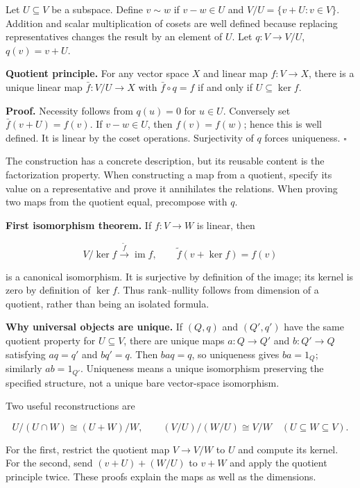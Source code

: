 \documentclass[
  11pt,
]{article}
\begin{document}
Let \(U\subseteq V\) be a subspace. Define \(v\sim w\) if \(v-w\in U\)
and \(V/U=\{v+U:v\in V\}\). Addition and scalar multiplication of cosets
are well defined because replacing representatives changes the result by
an element of \(U\). Let \(q:V\to V/U\), \(q(v)=v+U\).

\textbf{Quotient principle.} For any vector space \(X\) and linear map
\(f:V\to X\), there is a unique linear map \(\bar f:V/U\to X\) with
\(\bar f\circ q=f\) if and only if \(U\subseteq\ker f\).

\textbf{Proof.} Necessity follows from \(q(u)=0\) for \(u\in U\).
Conversely set \(\bar f(v+U)=f(v)\). If \(v-w\in U\), then
\(f(v)=f(w)\); hence this is well defined. It is linear by the coset
operations. Surjectivity of \(q\) forces uniqueness. \(\square\)

The construction has a concrete description, but its reusable content is
the factorization property. When constructing a map from a quotient,
specify its value on a representative and prove it annihilates the
relations. When proving two maps from the quotient equal, precompose
with \(q\).

\textbf{First isomorphism theorem.} If \(f:V\to W\) is linear, then

\[V/\ker f\xrightarrow{\ \widetilde f\ }\operatorname{im}f,
\qquad \widetilde f(v+\ker f)=f(v)
\]

is a canonical isomorphism. It is surjective by definition of the image;
its kernel is zero by definition of \(\ker f\). Thus rank--nullity
follows from dimension of a quotient, rather than being an isolated
formula.

\textbf{Why universal objects are unique.} If \((Q,q)\) and \((Q',q')\)
have the same quotient property for \(U\subseteq V\), there are unique
maps \(a:Q\to Q'\) and \(b:Q'\to Q\) satisfying \(a q=q'\) and
\(b q'=q\). Then \(baq=q\), so uniqueness gives \(ba=1_Q\); similarly
\(ab=1_{Q'}\). Uniqueness means a unique isomorphism preserving the
specified structure, not a unique bare vector-space isomorphism.

Two useful reconstructions are

\[
U/(U\cap W)\cong (U+W)/W,
\qquad (V/U)/(W/U)\cong V/W\quad(U\subseteq W\subseteq V).
\]

For the first, restrict the quotient map \(V\to V/W\) to \(U\) and
compute its kernel. For the second, send \((v+U)+(W/U)\) to \(v+W\) and
apply the quotient principle twice. These proofs explain the maps as
well as the dimensions.
\end{document}
